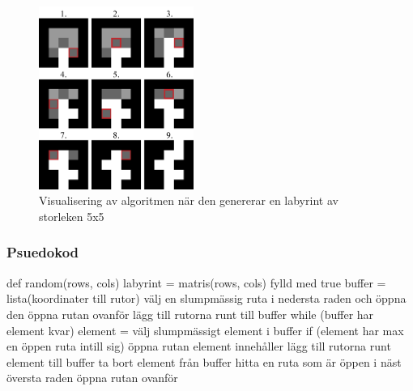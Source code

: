 \begin{figure}[h]
	\begin{center}
		\includegraphics[width=0.45\textwidth]{../img/w09-lab/AlgorithmVisualized.png}
	\end{center}
	\caption{Visualisering av algoritmen när den genererar en labyrint av storleken 5x5}
\end{figure}


\subsubsection{Psuedokod}
\begin{Code}
def random(rows, cols)
	labyrint = matris(rows, cols) fylld med true
	buffer = lista(koordinater till rutor)
	välj en slumpmässig ruta i nedersta raden och öppna den
	öppna rutan ovanför
	lägg till rutorna runt till buffer
	while (buffer har element kvar)
		element = välj slumpmässigt element i buffer
		if (element har max en öppen ruta intill sig)
			öppna rutan element innehåller
			lägg till rutorna runt element till buffer
		ta bort element från buffer
	hitta en ruta som är öppen i näst översta raden
	öppna rutan ovanför
\end{Code}



